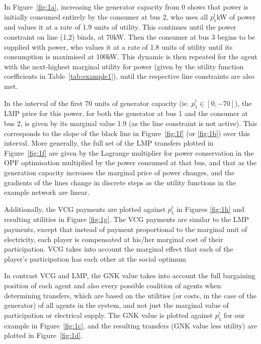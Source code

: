 




\DIFaddend \iffigures
% 

\fi

In Figure~\ref{fig:1a}, increasing the generator capacity from $0$ shows that power is initially consumed entirely by the consumer at bus 2, 
who uses all $p_1^l$kW of power and values it at a rate of 1.9 units of utility. This continues until the power constraint on line (1,2) binds, at 70kW.
Then the consumer at bus 3 begins to be supplied with power, who values it at a rate of 1.8 units of utility until its consumption is maximised at 100kW. 
This dynamic is then repeated for the agent with the next-highest marginal utility for power (given by the utility function coefficients in Table~\ref{tab:example1}), until the respective line constraints are also met.

In the interval of the first 70 units of generator capacity (ie. $p_1^l \in [0,-70]$), the LMP price for this power, for both the generator at bus 1 and the consumer at bus 2, is given by its marginal value 1.9 (as the line constraint is not active). This corresponds to the slope of the black line in Figure~\ref{fig:1f} (or \ref{fig:1b}) over this interval. 
More generally, the full set of the LMP transfers plotted in Figure~\ref{fig:1f} are given by the Lagrange multiplier for power conservation in the OPF optimisation multiplied by the power consumed at that bus, and that as the generation capacity increases the marginal price of power changes, and the gradients of the lines change in discrete steps as the utility functions in the example network are linear.

Additionally, the VCG payments are plotted against $p_1^l$ in Figures \ref{fig:1h} and resulting utilities in Figure \ref{fig:1g}.
The VCG payments are similar to the LMP payments, except that instead of payment proportional to the marginal unit of electricity, each player is compensated at his/her marginal cost of their participation.
VCG takes into account the marginal effect that each of the player's participation has \DIFdelbegin {}\DIFdelend \DIFaddbegin {}\DIFaddend each other at the social optimum

In contrast VCG and LMP, the GNK value takes into account the full bargaining position of each agent and also every possible coalition of agents when determining transfers, which are based on the utilities (or costs, in the case of the generator) of all agents in the system, and not just the marginal value of participation or electrical supply.
The GNK value is plotted against $p_1^l$ for our example in Figure~\ref{fig:1c}, and the resulting transfers (GNK value less utility) are plotted in Figure~\ref{fig:1d}.

